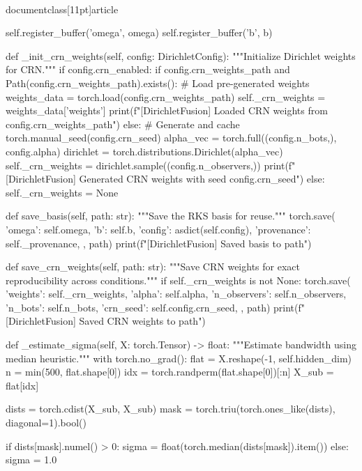 \\documentclass[11pt]{article}
\begin{document}
\begin{CodeBlock}
        self.register_buffer('omega', omega)
        self.register_buffer('b', b)
    
    def _init_crn_weights(self, config: DirichletConfig):
        """Initialize Dirichlet weights for CRN."""
        if config.crn_enabled:
            if config.crn_weights_path and Path(config.crn_weights_path).exists():
                # Load pre-generated weights
                weights_data = torch.load(config.crn_weights_path)
                self._crn_weights = weights_data['weights']
                print(f"[DirichletFusion] Loaded CRN weights from {config.crn_weights_path}")
            else:
                # Generate and cache
                torch.manual_seed(config.crn_seed)
                alpha_vec = torch.full((config.n_bots,), config.alpha)
                dirichlet = torch.distributions.Dirichlet(alpha_vec)
                self._crn_weights = dirichlet.sample((config.n_observers,))
                print(f"[DirichletFusion] Generated CRN weights with seed {config.crn_seed}")
        else:
            self._crn_weights = None
    
    def save_basis(self, path: str):
        """Save the RKS basis for reuse."""
        torch.save({
            'omega': self.omega,
            'b': self.b,
            'config': asdict(self.config),
            'provenance': self._provenance,
        }, path)
        print(f"[DirichletFusion] Saved basis to {path}")
    
    def save_crn_weights(self, path: str):
        """Save CRN weights for exact reproducibility across conditions."""
        if self._crn_weights is not None:
            torch.save({
                'weights': self._crn_weights,
                'alpha': self.alpha,
                'n_observers': self.n_observers,
                'n_bots': self.n_bots,
                'crn_seed': self.config.crn_seed,
            }, path)
            print(f"[DirichletFusion] Saved CRN weights to {path}")
    
    def _estimate_sigma(self, X: torch.Tensor) -> float:
        """Estimate bandwidth using median heuristic."""
        with torch.no_grad():
            flat = X.reshape(-1, self.hidden_dim)
            n = min(500, flat.shape[0])
            idx = torch.randperm(flat.shape[0])[:n]
            X_sub = flat[idx]
            
            dists = torch.cdist(X_sub, X_sub)
            mask = torch.triu(torch.ones_like(dists), diagonal=1).bool()
            
            if dists[mask].numel() > 0:
                sigma = float(torch.median(dists[mask]).item())
            else:
                sigma = 1.0
            

\end{CodeBlock}
\end{document}

